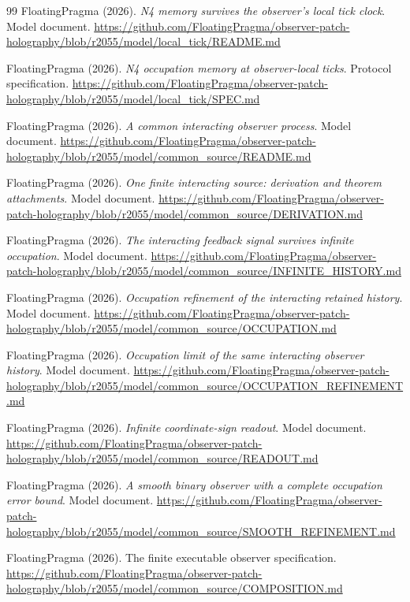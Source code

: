 \documentclass[11pt]{article}
\theoremstyle{definition}
\theoremstyle{remark}
\theoremstyle{plain}
\begin{document}
{\begin{thebibliography}{99}
FloatingPragma (2026). \emph{N4 memory survives the observer's local tick
clock}. Model document.
\url{https://github.com/FloatingPragma/observer-patch-holography/blob/r2055/model/local_tick/README.md}

FloatingPragma (2026). \emph{N4 occupation memory at observer-local ticks}.
Protocol specification.
\url{https://github.com/FloatingPragma/observer-patch-holography/blob/r2055/model/local_tick/SPEC.md}

FloatingPragma (2026). \emph{A common interacting observer process}. Model
document.
\url{https://github.com/FloatingPragma/observer-patch-holography/blob/r2055/model/common_source/README.md}

FloatingPragma (2026). \emph{One finite interacting source: derivation and
theorem attachments}. Model document.
\url{https://github.com/FloatingPragma/observer-patch-holography/blob/r2055/model/common_source/DERIVATION.md}

FloatingPragma (2026). \emph{The interacting feedback signal survives infinite
occupation}. Model document.
\url{https://github.com/FloatingPragma/observer-patch-holography/blob/r2055/model/common_source/INFINITE_HISTORY.md}

FloatingPragma (2026). \emph{Occupation refinement of the interacting retained
history}. Model document.
\url{https://github.com/FloatingPragma/observer-patch-holography/blob/r2055/model/common_source/OCCUPATION.md}

FloatingPragma (2026). \emph{Occupation limit of the same interacting observer
history}. Model document.
\url{https://github.com/FloatingPragma/observer-patch-holography/blob/r2055/model/common_source/OCCUPATION_REFINEMENT.md}

FloatingPragma (2026). \emph{Infinite coordinate-sign readout}. Model document.
\url{https://github.com/FloatingPragma/observer-patch-holography/blob/r2055/model/common_source/READOUT.md}

FloatingPragma (2026). \emph{A smooth binary observer with a complete occupation
error bound}. Model document.
\url{https://github.com/FloatingPragma/observer-patch-holography/blob/r2055/model/common_source/SMOOTH_REFINEMENT.md}

FloatingPragma (2026). The finite executable observer specification.
\url{https://github.com/FloatingPragma/observer-patch-holography/blob/r2055/model/common_source/COMPOSITION.md}


\end{thebibliography}}
\end{document}
